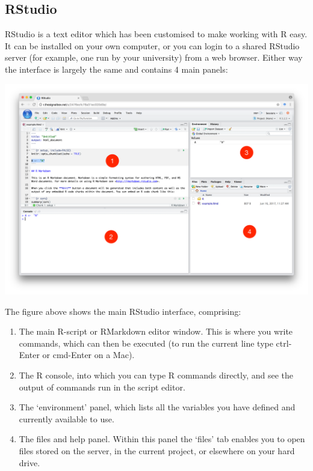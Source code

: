 \documentclass[]{article}
\theoremstyle{definition}
\theoremstyle{definition}
\theoremstyle{definition}
\theoremstyle{remark}
\begin{document}
\hypertarget{rstudio}{\subsection*{RStudio}\label{rstudio}}

RStudio is a text editor which has been customised to make working with
R easy. It can be installed on your own computer, or you can login to a
shared RStudio server (for example, one run by your university) from a
web browser. Either way the interface is largely the same and contains 4
main panels:

\includegraphics[width=41.53in]{media/rstudio-mainwindow}

The figure above shows the main RStudio interface, comprising:

\begin{enumerate}
\def\labelenumi{\arabic{enumi}.}
\item
  The main R-script or RMarkdown editor window. This is where you write
  commands, which can then be executed (to run the current line type
  ctrl-Enter or cmd-Enter on a Mac).
\item
  The R console, into which you can type R commands directly, and see
  the output of commands run in the script editor.
\item
  The `environment' panel, which lists all the variables you have
  defined and currently available to use.
\item
  The files and help panel. Within this panel the `files' tab enables
  you to open files stored on the server, in the current project, or
  elsewhere on your hard drive.
\end{enumerate}
\end{document}
